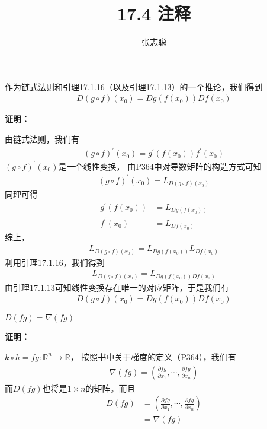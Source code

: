 \documentclass{article}
\begin{document}
\title{17.4 注释}
\author{张志聪}
\maketitle

\begin{zremark}
  作为链式法则和引理17.1.16（以及引理17.1.13）的一个推论，我们得到
  \begin{align*}
    D(g \circ f)(x_0) = Dg(f(x_0)) Df(x_0)
  \end{align*}
\end{zremark}

\textbf{证明：}

由链式法则，我们有
\begin{align*}
  (g \circ f)^\prime(x_0) = g^\prime(f(x_0)) f^\prime(x_0)
\end{align*}
$(g \circ f)^\prime(x_0)$是一个线性变换，
由P364中对导数矩阵的构造方式可知
\begin{align*}
  (g \circ f)^\prime(x_0) = L_{D(g \circ f)(x_0)}
\end{align*}
同理可得
\begin{align*}
  g^\prime(f(x_0)) & = L_{Dg(f(x_0))} \\
  f^\prime(x_0)    & = L_{Df(x_0)}
\end{align*}
综上，
\begin{align*}
  L_{D(g \circ f)(x_0)} = L_{Dg(f(x_0))} L_{Df(x_0)}
\end{align*}
利用引理17.1.16，我们得到
\begin{align*}
  L_{D(g \circ f)(x_0)} = L_{Dg(f(x_0)) Df(x_0)} 
\end{align*}
由引理17.1.13可知线性变换存在唯一的对应矩阵，于是我们有
\begin{align*}
  D(g \circ f)(x_0) = Dg(f(x_0)) Df(x_0)
\end{align*}

\begin{zremark}
  $D(fg) = \nabla (fg)$
\end{zremark}

\textbf{证明：}

$k \circ h = fg: \mathbb{R}^n \to \mathbb{R}$，
按照书中关于梯度的定义（P364），我们有
\begin{align*}
  \nabla (fg) = \left(\frac{\partial fg}{\partial x_1}, \cdots, \frac{\partial fg}{\partial x_n}\right)
\end{align*}
而$D(fg)$也将是$1 \times n$的矩阵。而且
\begin{align*}
  D(fg) & = \left(\frac{\partial fg}{\partial x_1}, \cdots, \frac{\partial fg}{\partial x_n}\right) \\
        & = \nabla (fg)
\end{align*}
\end{document}
